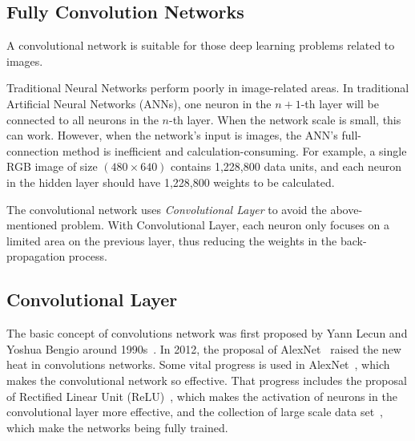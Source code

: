 \begin{spacing}{1.5}
\section{Fully Convolution Networks}
\label{sec:LR_FCN}

A convolutional network is suitable for those deep learning problems related to images.

Traditional Neural Networks perform poorly in image-related areas. In traditional Artificial Neural Networks (ANNs), one neuron in the $n+1$-th layer will be connected to all neurons in the $n$-th layer. When the network scale is small, this can work. However, when the network's input is images, the ANN's full-connection method is inefficient and calculation-consuming. For example, a single RGB image of size $(480 \times 640)$ contains 1,228,800 data units, and each neuron in the hidden layer should have 1,228,800 weights to be calculated.

The convolutional network uses \textit{Convolutional Layer} to avoid the above-mentioned problem. With Convolutional Layer, each neuron only focuses on a limited area on the previous layer, thus reducing the weights in the back-propagation process.

\subsection{Convolutional Layer}

The basic concept of convolutions network was first proposed by Yann Lecun and Yoshua Bengio around 1990s~\cite{bengio1997convolutional, lecun1989backpropagation}. In 2012, the proposal of AlexNet~\cite{krizhevsky2012imagenet} raised the new heat in convolutions networks. Some vital progress is used in AlexNet~\cite{kaiming2014learning}, which makes the convolutional network so effective. That progress includes the proposal of Rectified Linear Unit (ReLU)~\cite{nair2010rectified}, which makes the activation of neurons in the convolutional layer more effective, and the collection of large scale data set~\cite{deng2009imagenet}, which make the networks being fully trained.



\end{spacing}
